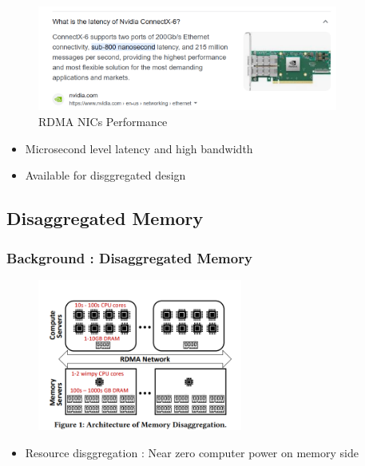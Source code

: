 \documentclass[11pt]{beamer}                                                                                                   %
\begin{document}
\begin{frame}[t]
	
	\begin{figure}[ht]%
		\centering  %
		\includegraphics[width=0.88\textwidth]{02.png}  
		\caption{RDMA NICs Performance}  %
		
	\end{figure}
	\begin{itemize}
		\item Microsecond level latency and high bandwidth
		\item Available for disggregated design
	\end{itemize}
\end{frame}
\subsection{Disaggregated Memory}
\begin{frame}[t]
	\frametitle{Background : Disaggregated Memory}
		\begin{figure}[ht]%
		\centering  %
		\includegraphics[width=0.60\textwidth]{05.png}  
		
	\end{figure}
\begin{itemize}
	\item Resource disggregation
	 : Near zero computer power on memory side
\end{itemize}
\end{frame}
\end{document}
